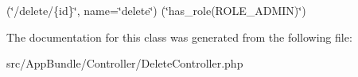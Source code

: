 (\char`\"{}/delete/\{id\}\char`\"{}, name=\char`\"{}delete\char`\"{}) (\char`\"{}has\+\_\+role(\textquotesingle{}\+R\+O\+L\+E\+\_\+\+A\+D\+M\+I\+N\textquotesingle{})\char`\"{}) 

The documentation for this class was generated from the following file\+:\begin{DoxyCompactItemize}
\item 
src/\+App\+Bundle/\+Controller/Delete\+Controller.\+php\end{DoxyCompactItemize}
